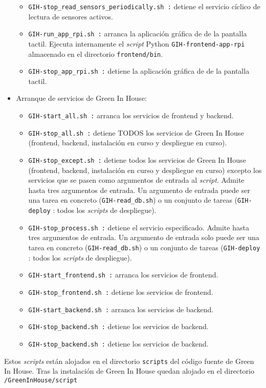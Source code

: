 \begin{itemize}
\begin{itemize}
                \item \texttt{GIH-stop\_read\_sensors\_periodically.sh :} detiene el servicio cíclico de lectura de sensores activos.
                \item \texttt{GIH-run\_app\_rpi.sh :} arranca la aplicación gráfica de de la pantalla tactil. Ejecuta internamente el \textit{script} Python \texttt{GIH-frontend-app-rpi} almacenado en el directorio \texttt{frontend/bin}.
                \item \texttt{GIH-stop\_app\_rpi.sh :} detiene la aplicación gráfica de de la pantalla tactil.
            \end{itemize}
            \item Arranque de servicios de Green In House:
            \begin{itemize}
                \item \texttt{GIH-start\_all.sh :} arranca los servicios de frontend y backend.
                \item \texttt{GIH-stop\_all.sh :} detiene TODOS los servicios de Green In House (frontend, backend, instalación en curso y despliegue en curso).
                \item \texttt{GIH-stop\_except.sh :} detiene todos los servicios de Green In House (frontend, backend, instalación en curso y despliegue en curso) excepto los servicios que se pasen como argumentos de entrada al \textit{script}. Admite hasta tres argumentos de entrada. Un argumento de entrada puede ser una tarea en concreto (\texttt{GIH-read\_db.sh}) o un conjunto de tareas (\texttt{GIH-deploy} : todos los \textit{scripts} de despliegue).
                \item \texttt{GIH-stop\_process.sh :} detiene el servicio especificado. Admite hasta tres argumentos de entrada. Un argumento de entrada solo puede ser una tarea en concreto (\texttt{GIH-read\_db.sh}) o un conjunto de tareas (\texttt{GIH-deploy} : todos los \textit{scripts} de despliegue).
                \item \texttt{GIH-start\_frontend.sh :} arranca los servicios de frontend.
                \item \texttt{GIH-stop\_frontend.sh :} detiene los servicios de frontend.
                \item \texttt{GIH-start\_backend.sh :} arranca los servicios de backend.
                \item \texttt{GIH-stop\_backend.sh :} detiene los servicios de backend.
                \item \texttt{GIH-stop\_backend.sh :} detiene los servicios de backend.
            \end{itemize}    
        \end{itemize} 
        Estos \textit{scripts} están alojados en el directorio \texttt{scripts} del código fuente de Green In House. Tras la instalación de Green In House quedan alojado en el directorio \texttt{/GreenInHouse/script}
    
